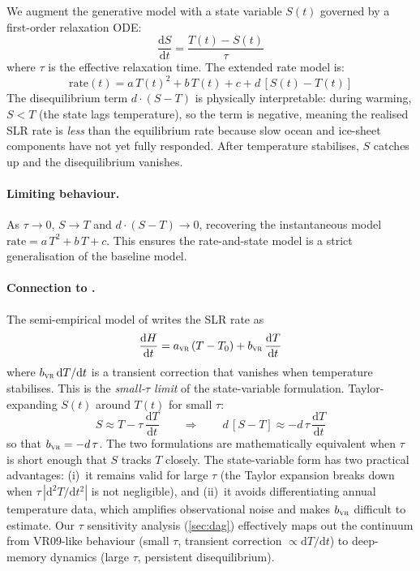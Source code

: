 \documentclass[11pt]{article}
\begin{document}
We augment the generative model with a state variable $S(t)$ governed by a first-order relaxation ODE:
\begin{equation}
  \frac{\mathrm{d}S}{\mathrm{d}t} = \frac{T(t) - S(t)}{\tau}
  \label{eq:state_ode}
\end{equation}
where $\tau$ is the effective relaxation time.  The extended rate model is:
\begin{equation}
  \text{rate}(t) = a\,T(t)^2 + b\,T(t) + c + d\,[S(t) - T(t)]
  \label{eq:state_rate}
\end{equation}
The disequilibrium term $d \cdot (S - T)$ is physically interpretable: during warming, $S < T$ (the state lags temperature), so the term is negative, meaning the realised SLR rate is \emph{less} than the equilibrium rate because slow ocean and ice-sheet components have not yet fully responded.  After temperature stabilises, $S$ catches up and the disequilibrium vanishes.

\paragraph{Limiting behaviour.}  As $\tau \to 0$, $S \to T$ and $d \cdot (S - T) \to 0$, recovering the instantaneous model $\text{rate} = a\,T^2 + b\,T + c$.  This ensures the rate-and-state model is a strict generalisation of the baseline model.

\paragraph{Connection to \citet{vermeer2009global}.}
The semi-empirical model of \citet{vermeer2009global} writes the SLR rate as
\begin{equation}
  \frac{\mathrm{d}H}{\mathrm{d}t} = a_{\textsc{vr}}\,(T - T_0) + b_{\textsc{vr}}\,\frac{\mathrm{d}T}{\mathrm{d}t}
  \label{eq:vr09}
\end{equation}
where $b_{\textsc{vr}}\,\mathrm{d}T/\mathrm{d}t$ is a transient correction that vanishes when temperature stabilises.  This is the \emph{small-$\tau$ limit} of the state-variable formulation.  Taylor-expanding $S(t)$ around $T(t)$ for small $\tau$:
\begin{equation}
  S \approx T - \tau\,\frac{\mathrm{d}T}{\mathrm{d}t}
  \qquad\Longrightarrow\qquad
  d\,[S - T] \approx -d\,\tau\,\frac{\mathrm{d}T}{\mathrm{d}t}
  \label{eq:vr09_limit}
\end{equation}
so that $b_{\textsc{vr}} = -d\,\tau$.  The two formulations are mathematically equivalent when $\tau$ is short enough that $S$ tracks $T$ closely.  The state-variable form has two practical advantages: (i)~it remains valid for large $\tau$ (the Taylor expansion breaks down when $\tau\,|\mathrm{d}^2T/\mathrm{d}t^2|$ is not negligible), and (ii)~it avoids differentiating annual temperature data, which amplifies observational noise and makes $b_{\textsc{vr}}$ difficult to estimate.  Our $\tau$ sensitivity analysis (\cref{sec:dag}) effectively maps out the continuum from VR09-like behaviour (small $\tau$, transient correction $\propto \mathrm{d}T/\mathrm{d}t$) to deep-memory dynamics (large $\tau$, persistent disequilibrium).
\end{document}

